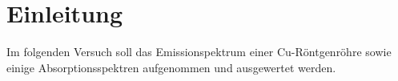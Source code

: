 \section{Einleitung}
\label{sec:einleitung}
Im folgenden Versuch soll das Emissionspektrum einer Cu-Röntgenröhre sowie einige
Absorptionsspektren aufgenommen und ausgewertet werden.
